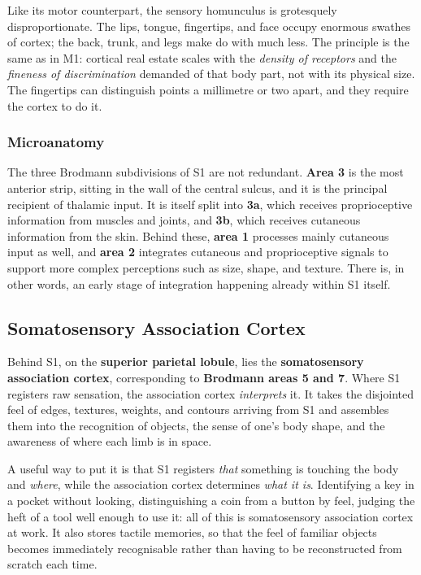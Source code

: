 \documentclass[11pt]{article}
\begin{document}
Like its motor counterpart, the sensory homunculus is grotesquely disproportionate. The lips, tongue, fingertips, and face occupy enormous swathes of cortex; the back, trunk, and legs make do with much less. The principle is the same as in M1: cortical real estate scales with the \textit{density of receptors} and the \textit{fineness of discrimination} demanded of that body part, not with its physical size. The fingertips can distinguish points a millimetre or two apart, and they require the cortex to do it.

\subsubsection{Microanatomy}

The three Brodmann subdivisions of S1 are not redundant. \textbf{Area 3} is the most anterior strip, sitting in the wall of the central sulcus, and it is the principal recipient of thalamic input. It is itself split into \textbf{3a}, which receives proprioceptive information from muscles and joints, and \textbf{3b}, which receives cutaneous information from the skin. Behind these, \textbf{area 1} processes mainly cutaneous input as well, and \textbf{area 2} integrates cutaneous and proprioceptive signals to support more complex perceptions such as size, shape, and texture. There is, in other words, an early stage of integration happening already within S1 itself.

\subsection{Somatosensory Association Cortex}

Behind S1, on the \textbf{superior parietal lobule}, lies the \textbf{somatosensory association cortex}, corresponding to \textbf{Brodmann areas 5 and 7}. Where S1 registers raw sensation, the association cortex \textit{interprets} it. It takes the disjointed feel of edges, textures, weights, and contours arriving from S1 and assembles them into the recognition of objects, the sense of one's body shape, and the awareness of where each limb is in space.

A useful way to put it is that S1 registers \textit{that} something is touching the body and \textit{where}, while the association cortex determines \textit{what it is}. Identifying a key in a pocket without looking, distinguishing a coin from a button by feel, judging the heft of a tool well enough to use it: all of this is somatosensory association cortex at work. It also stores tactile memories, so that the feel of familiar objects becomes immediately recognisable rather than having to be reconstructed from scratch each time.
\end{document}
